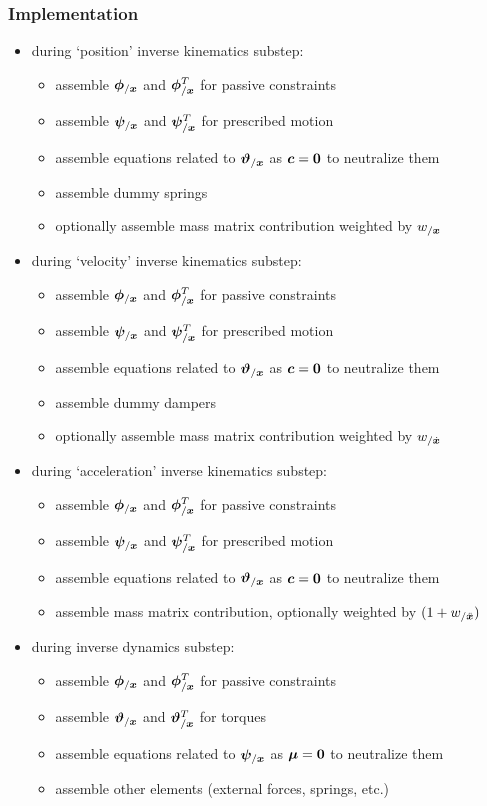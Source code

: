 \subsubsection{Implementation}
\begin{itemize}
\item during `position' inverse kinematics substep:
\begin{itemize}
\item assemble $\bm{\phi}_{/\bm{x}}$ and $\bm{\phi}_{/\bm{x}}^T$
for passive constraints
\item assemble $\bm{\psi}_{/\bm{x}}$ and $\bm{\psi}_{/\bm{x}}^T$
for prescribed motion
\item assemble equations related to $\bm{\vartheta}_{/\bm{x}}$
as $\bm{c} = \bm{0}$ to neutralize them
\item assemble dummy springs
\item optionally assemble mass matrix contribution weighted by $w_{/\bm{x}}$
\end{itemize}


\item during `velocity' inverse kinematics substep:
\begin{itemize}
\item assemble $\bm{\phi}_{/\bm{x}}$ and $\bm{\phi}_{/\bm{x}}^T$
for passive constraints
\item assemble $\bm{\psi}_{/\bm{x}}$ and $\bm{\psi}_{/\bm{x}}^T$
for prescribed motion
\item assemble equations related to $\bm{\vartheta}_{/\bm{x}}$
as $\bm{c} = \bm{0}$ to neutralize them
\item assemble dummy dampers
\item optionally assemble mass matrix contribution weighted by $w_{/\dot{\bm{x}}}$
\end{itemize}


\item during `acceleration' inverse kinematics substep:
\begin{itemize}
\item assemble $\bm{\phi}_{/\bm{x}}$ and $\bm{\phi}_{/\bm{x}}^T$
for passive constraints
\item assemble $\bm{\psi}_{/\bm{x}}$ and $\bm{\psi}_{/\bm{x}}^T$
for prescribed motion
\item assemble equations related to $\bm{\vartheta}_{/\bm{x}}$
as $\bm{c} = \bm{0}$ to neutralize them
\item assemble mass matrix contribution, optionally weighted by $(1 + w_{/\ddot{\bm{x}}})$
\end{itemize}


\item during inverse dynamics substep:
\begin{itemize}
\item assemble $\bm{\phi}_{/\bm{x}}$ and $\bm{\phi}_{/\bm{x}}^T$
for passive constraints
\item assemble $\bm{\vartheta}_{/\bm{x}}$ and $\bm{\vartheta}_{/\bm{x}}^T$
for torques
\item assemble equations related to $\bm{\psi}_{/\bm{x}}$
as $\bm{\mu} = \bm{0}$ to neutralize them
\item assemble other elements (external forces, springs, etc.)
\end{itemize}
\end{itemize}
